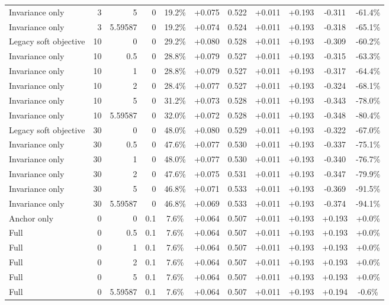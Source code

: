 \begin{table}[htbp]
\begin{tabular}{lrrrccccccc}
Invariance only & 3 & 5 & 0 & 19.2\% & +0.075 & 0.522 & +0.011 & +0.193 & -0.311 & -61.4\% \\
Invariance only & 3 & 5.59587 & 0 & 19.2\% & +0.074 & 0.524 & +0.011 & +0.193 & -0.318 & -65.1\% \\
Legacy soft objective & 10 & 0 & 0 & 29.2\% & +0.080 & 0.528 & +0.011 & +0.193 & -0.309 & -60.2\% \\
Invariance only & 10 & 0.5 & 0 & 28.8\% & +0.079 & 0.527 & +0.011 & +0.193 & -0.315 & -63.3\% \\
Invariance only & 10 & 1 & 0 & 28.8\% & +0.079 & 0.527 & +0.011 & +0.193 & -0.317 & -64.4\% \\
Invariance only & 10 & 2 & 0 & 28.4\% & +0.077 & 0.527 & +0.011 & +0.193 & -0.324 & -68.1\% \\
Invariance only & 10 & 5 & 0 & 31.2\% & +0.073 & 0.528 & +0.011 & +0.193 & -0.343 & -78.0\% \\
Invariance only & 10 & 5.59587 & 0 & 32.0\% & +0.072 & 0.528 & +0.011 & +0.193 & -0.348 & -80.4\% \\
Legacy soft objective & 30 & 0 & 0 & 48.0\% & +0.080 & 0.529 & +0.011 & +0.193 & -0.322 & -67.0\% \\
Invariance only & 30 & 0.5 & 0 & 47.6\% & +0.077 & 0.530 & +0.011 & +0.193 & -0.337 & -75.1\% \\
Invariance only & 30 & 1 & 0 & 48.0\% & +0.077 & 0.530 & +0.011 & +0.193 & -0.340 & -76.7\% \\
Invariance only & 30 & 2 & 0 & 47.6\% & +0.075 & 0.531 & +0.011 & +0.193 & -0.347 & -79.9\% \\
Invariance only & 30 & 5 & 0 & 46.8\% & +0.071 & 0.533 & +0.011 & +0.193 & -0.369 & -91.5\% \\
Invariance only & 30 & 5.59587 & 0 & 46.8\% & +0.069 & 0.533 & +0.011 & +0.193 & -0.374 & -94.1\% \\
Anchor only & 0 & 0 & 0.1 & 7.6\% & +0.064 & 0.507 & +0.011 & +0.193 & +0.193 & +0.0\% \\
Full & 0 & 0.5 & 0.1 & 7.6\% & +0.064 & 0.507 & +0.011 & +0.193 & +0.193 & +0.0\% \\
Full & 0 & 1 & 0.1 & 7.6\% & +0.064 & 0.507 & +0.011 & +0.193 & +0.193 & +0.0\% \\
Full & 0 & 2 & 0.1 & 7.6\% & +0.064 & 0.507 & +0.011 & +0.193 & +0.193 & +0.0\% \\
Full & 0 & 5 & 0.1 & 7.6\% & +0.064 & 0.507 & +0.011 & +0.193 & +0.193 & +0.0\% \\
Full & 0 & 5.59587 & 0.1 & 7.6\% & +0.064 & 0.507 & +0.011 & +0.193 & +0.194 & -0.6\% \\

\end{tabular}
\end{table}
